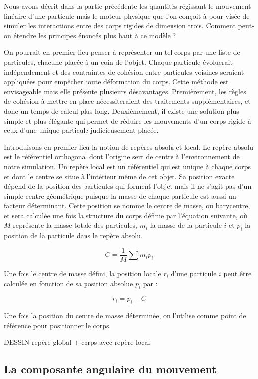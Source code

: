 Nous avons décrit dans la partie précédente les quantités régissant le mouvement linéaire d'une particule mais le moteur physique que l'on conçoit à pour visée de simuler les interactions entre des corps rigides de dimension trois. Comment peut-on étendre les principes énoncés plus haut à ce modèle ?

On pourrait en premier lieu penser à représenter un tel corps par une liste de particules, chacune placée à un coin de l'objet. Chaque particule évoluerait indépendement et des contraintes de cohésion entre particules voisines seraient appliquées pour empêcher toute déformation du corps. Cette méthode est envisageable mais elle présente plusieurs désavantages. Premièrement, les règles de cohésion à mettre en place nécessiteraient des traitements supplémentaires, et donc un temps de calcul plus long. Deuxièmement, il existe une solution plus simple et plus élégante qui permet de réduire les mouvements d'un corps rigide à ceux d'une unique particule judicieusement placée.

Introduisons en premier lieu la notion de repères absolu et local. Le repère absolu est le référentiel orthogonal dont l'origine sert de centre à l'environnement de notre simulation. Un repère local est un référentiel qui est unique à chaque corps et dont le centre se situe à l'intérieur même de cet objet. Sa position exacte dépend de la position des particules qui forment l'objet mais il ne s'agit pas d'un simple centre géométrique puisque la masse de chaque particule est aussi un facteur déterminant. Cette position se nomme le centre de masse, ou barycentre, et sera calculée une fois la structure du corps définie par l'équation suivante, o\`u $M$ représente la masse totale des particules, $m_i$ la masse de la particule $i$ et $p_i$ la position de la particule dans le repère absolu.

\[C = \frac{1}{M} \sum m_i p_i\]

Une fois le centre de masse défini, la position locale $r_i$ d'une particule $i$ peut être calculée en fonction de sa position absolue $p_i$ par :

\[r_i = p_i - C\]

Une fois la position du centre de masse déterminée, on l'utilise comme point de référence pour positionner le corps.

DESSIN repère global + corps avec repère local

\subsection{La composante angulaire du mouvement}


